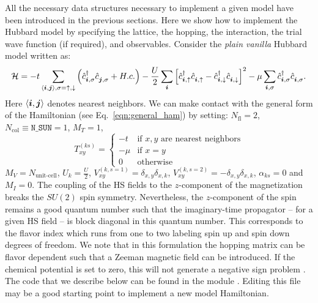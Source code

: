 

All the necessary data structures necessary to implement a given model have been introduced in the previous sections. Here we show how to implement the Hubbard model  by specifying the lattice, the hopping, the interaction, the trial wave function  (if  required), and  observables.  Consider  the  \textit{plain vanilla}  Hubbard model  written as: 
\begin{equation}
\label{eqn_hubbard_Mz}
\mathcal{H}=
- t 
\sum\limits_{\langle \ve{i}, \ve{j} \rangle,  \sigma={\uparrow,\downarrow}} 
  \left(  \hat{c}^{\dagger}_{\ve{i}, \sigma} \hat{c}^{\phantom\dagger}_{\ve{j},\sigma}  + H.c. \right) 
- \frac{U}{2}\sum\limits_{\ve{i}}\left[
\hat{c}^{\dagger}_{\ve{i}, \uparrow} \hat{c}^{\phantom\dagger}_{\ve{i}, \uparrow}  -   \hat{c}^{\dagger}_{\ve{i}, \downarrow} \hat{c}^{\phantom\dagger}_{\ve{i}, \downarrow}  \right]^{2}   
-  \mu \sum_{\ve{i},\sigma } \hat{c}^{\dagger}_{\ve{i}, \sigma}  \hat{c}^{\phantom\dagger}_{\ve{i},\sigma}. 
\end{equation} 
Here $ \langle \boldsymbol{i}, \boldsymbol{j} \rangle $    denotes nearest neighbors. 
We can make contact with the general form of the Hamiltonian  (see Eq.~\ref{eqn:general_ham}) by setting: 
$N_{\mathrm{fl}} = 2$, $N_{\mathrm{col}} \equiv \texttt{N\_SUN}     =1 $, 
 $M_T    =    1$, 
 \begin{equation}
  T^{(ks)}_{x y}   = 
  \left\{ 
 \begin{array}{ll}
       -t         & \text{if } x,y \text{ are nearest neighbors} \\
       -\mu    & \text{if } x = y \\
       0         &  \text{otherwise}
 \end{array}
  \right.
 \end{equation}
 $M_V   =  N_{\text{unit-cell}} $,  $U_{k}       =   \frac{U}{2}$, 
 $V_{x y}^{(k, s=1)} =  \delta_{x,y} \delta_{x,k}  $,  $V_{x y}^{(k, s=2)} =  - \delta_{x,y} \delta_{x,k}  $,  $\alpha_{ks}   = 0  $ and $M_I       = 0 $.   
 The coupling of the HS fields to the $z$-component of   the magnetization breaks the $SU(2)$ spin symmetry. Nevertheless, the $z$-component of the spin remains a good quantum number such that the imaginary-time propagator -- for a given HS field -- is block  diagonal in this quantum number. This corresponds to the flavor index  which runs from one to two  labeling spin up and spin down  degrees of freedom.     We note that  in this formulation the  hopping matrix can be flavor dependent such that a Zeeman  magnetic field can be introduced.  If the chemical potential is set to zero, this will not generate a negative sign problem \cite{Wu04,Milat04,Bercx09}.    
The code that we describe below  can be found in the module .   Editing this file may be a good starting point to implement a new model Hamiltonian. 

